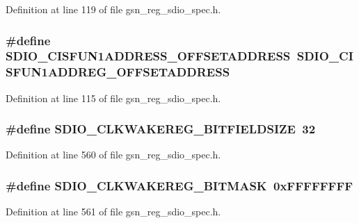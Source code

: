 Definition at line 119 of file gsn\_\-reg\_\-sdio\_\-spec.h.

\hypertarget{a00571_a72e49877a79bedd18141cb5afebfbf6f}{
\subsubsection[{SDIO\_\-CISFUN1ADDRESS\_\-OFFSETADDRESS}]{\setlength{\rightskip}{0pt plus 5cm}\#define SDIO\_\-CISFUN1ADDRESS\_\-OFFSETADDRESS~SDIO\_\-CISFUN1ADDREG\_\-OFFSETADDRESS}}
\label{a00571_a72e49877a79bedd18141cb5afebfbf6f}


Definition at line 115 of file gsn\_\-reg\_\-sdio\_\-spec.h.

\hypertarget{a00571_a34c9dd18379734c57268afe587231b76}{
\subsubsection[{SDIO\_\-CLKWAKEREG\_\-BITFIELDSIZE}]{\setlength{\rightskip}{0pt plus 5cm}\#define SDIO\_\-CLKWAKEREG\_\-BITFIELDSIZE~32}}
\label{a00571_a34c9dd18379734c57268afe587231b76}


Definition at line 560 of file gsn\_\-reg\_\-sdio\_\-spec.h.

\hypertarget{a00571_a4b64b1f90905fe141064026bd5a292fb}{
\subsubsection[{SDIO\_\-CLKWAKEREG\_\-BITMASK}]{\setlength{\rightskip}{0pt plus 5cm}\#define SDIO\_\-CLKWAKEREG\_\-BITMASK~0xFFFFFFFF}}
\label{a00571_a4b64b1f90905fe141064026bd5a292fb}


Definition at line 561 of file gsn\_\-reg\_\-sdio\_\-spec.h.


